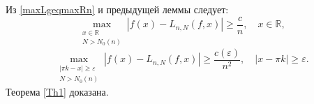 
Из \eqref{maxLgeqmaxRn}  и предыдущей леммы следует:
$$
\max_{\substack{x \in \mathbb{R} \\ N > N_0(n)}}\left|f(x) - L_{n,N}(f,x)\right| \geq \frac{c}{n}, \quad x \in \mathbb{R},
$$
$$
\max_{\substack{\left|\pi k - x\right| \geq \varepsilon \\ N > N_0(n)}} \left|f(x) - L_{n,N}(f,x)\right| \geq \frac{c(\varepsilon)}{n^2},\quad \left|x - \pi k\right| \geq \varepsilon.
$$
Теорема \ref{Th1} доказана.



